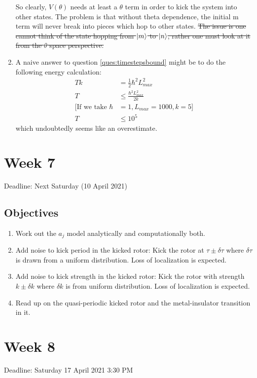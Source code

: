 \documentclass[12pt]{article}
\begin{document}
\begin{enumerate}
    So clearly, $V(\theta)$ needs at least a $\theta$ term in order to kick the
    system into other states. The problem is that without theta dependence, the
    initial m term will never break into pieces which hop to other states.
    \sout{The issue is one cannot think of the state hopping from $\ket{m}$ to
    $\ket{n}$, rather one must look at it from the $\theta$ space perspective.}

    \item A naive answer to question \ref{ques:timestepsbound} might be to do
    the following energy calculation:
    \begin{align}
        T k &= \frac{1}{2} \hbar^2 L_{max}^2 \\
        T &\leq \frac{\hbar^2 L_{max}^2}{2 k} \\
        [\text{If we take } \hbar &= 1, L_{max} = 1000, k = 5] \nonumber \\
        T &\leq 10^5
    \end{align}
    which undoubtedly seems like an overestimate.
\end{enumerate}

\section{Week 7}
Deadline: Next Saturday (10 April 2021)
\subsection{Objectives}
\begin{enumerate}
    \item Work out the $a_j$ model analytically and computationally both.

    \item Add noise to kick period in the kicked rotor:
    Kick the rotor at $\tau \pm \delta\tau$ where $\delta\tau$ is drawn from a
    uniform distribution. Loss of localization is expected.

    \item Add noise to kick strength in the kicked rotor:
    Kick the rotor with strength $k \pm \delta k$ where $\delta k$ is from
    uniform distribution. Loss of localization is expected.

    \item Read up on the quasi-periodic kicked rotor and the metal-insulator
    transition in it.
\end{enumerate}

\section{Week 8}
Deadline: Saturday 17 April 2021 3:30 PM
\end{document}
